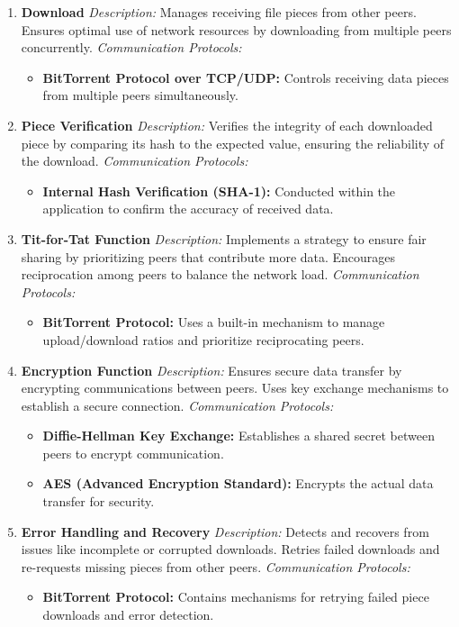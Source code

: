 \documentclass[a4paper]{article}
\begin{document}
\begin{enumerate}[label=\textbf{\arabic*.}, leftmargin=30pt, itemsep=10pt]
    \item \textbf{Download}  
    \textit{Description:} Manages receiving file pieces from other peers. Ensures optimal use of network resources by downloading from multiple peers concurrently.  
    \textit{Communication Protocols:}
    \begin{itemize}
        \item \textbf{BitTorrent Protocol over TCP/UDP:} Controls receiving data pieces from multiple peers simultaneously.
    \end{itemize}

    \item \textbf{Piece Verification}  
    \textit{Description:} Verifies the integrity of each downloaded piece by comparing its hash to the expected value, ensuring the reliability of the download.  
    \textit{Communication Protocols:}
    \begin{itemize}
        \item \textbf{Internal Hash Verification (SHA-1):} Conducted within the application to confirm the accuracy of received data.
    \end{itemize}

    \item \textbf{Tit-for-Tat Function}  
    \textit{Description:} Implements a strategy to ensure fair sharing by prioritizing peers that contribute more data. Encourages reciprocation among peers to balance the network load.  
    \textit{Communication Protocols:}
    \begin{itemize}
        \item \textbf{BitTorrent Protocol:} Uses a built-in mechanism to manage upload/download ratios and prioritize reciprocating peers.
    \end{itemize}

    \item \textbf{Encryption Function}  
    \textit{Description:} Ensures secure data transfer by encrypting communications between peers. Uses key exchange mechanisms to establish a secure connection.  
    \textit{Communication Protocols:}
    \begin{itemize}
        \item \textbf{Diffie-Hellman Key Exchange:} Establishes a shared secret between peers to encrypt communication.
        \item \textbf{AES (Advanced Encryption Standard):} Encrypts the actual data transfer for security.
    \end{itemize}

    \item \textbf{Error Handling and Recovery}  
    \textit{Description:} Detects and recovers from issues like incomplete or corrupted downloads. Retries failed downloads and re-requests missing pieces from other peers.  
    \textit{Communication Protocols:}
    \begin{itemize}
        \item \textbf{BitTorrent Protocol:} Contains mechanisms for retrying failed piece downloads and error detection.
    \end{itemize}

\end{enumerate}
\end{document}
